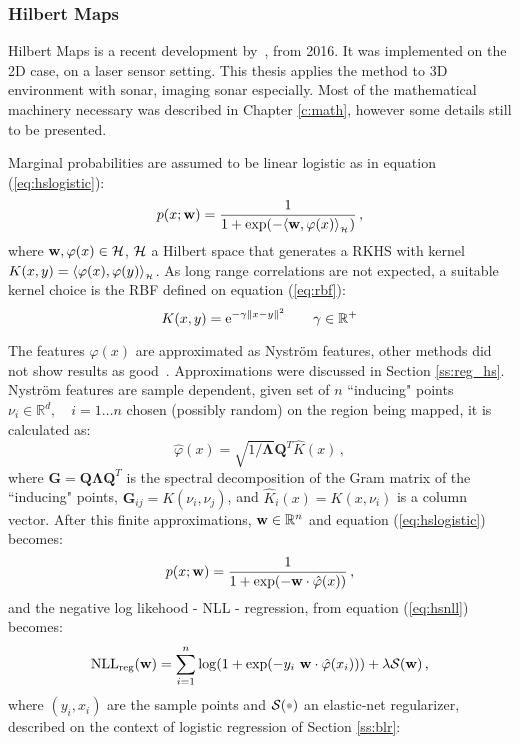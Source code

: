 \subsubsection{Hilbert Maps}
\label{sss:hilbertcontinuousmap}
Hilbert Maps is a recent development by~\citet{ramos2016hilbert}, from 2016. It
was implemented on the 2D case, on a laser sensor setting. This thesis applies
the method to 3D environment with sonar, imaging sonar especially. Most of the
mathematical machinery necessary was described in Chapter \ref{c:math}, however
some details still to be presented.

Marginal probabilities are assumed to be linear logistic as in equation
(\ref{eq:hslogistic}):
\begin{equation*}
p(x;\mathrm{\mathbf{w}}) = \frac{1}{1+\exp(-\langle \mathrm{\mathbf{w}},\varphi(x)\rangle_{_{\mathcal{H}}})}\,,
\end{equation*}
%
where $\mathrm{\mathbf{w}}, \varphi(x)\in\mathcal{H}$, $\mathcal{H}$ a Hilbert space that generates a RKHS
with kernel $K(x,y)=\langle \varphi(x),\varphi(y)\rangle_{_{\mathcal{H}}}$. As long range correlations
are not expected, a suitable kernel choice is the RBF defined on
equation (\ref{eq:rbf}):
\begin{equation*}
K(x,y) = \mathrm{e}^{-\gamma\left\lVert x-y\right\rVert^2} \qquad \gamma \in \mathbb{R}^+
\end{equation*}

The features $\varphi(x)$ are approximated as Nystr\"om features, other
methods did not show results as good~\cite{ramos2016hilbert}. Approximations
were discussed in Section \ref{ss:reg_hs}. Nystr\"om features are sample
dependent, given set of $n$ ``inducing" points $\nu_i\in\mathbb{R}^d, \quad
i=1\ldots n$ chosen (possibly random) on the region being mapped, it is
calculated as:
\begin{equation}
\label{eq:nystrom}
\hat\varphi(x) = \sqrt{1/\mathbf{\Lambda}}\mathbf{Q}^T\hat K(x)\,,
\end{equation}
 where $\mathbf{G}=\mathbf{Q}\mathbf{\Lambda}\mathbf{Q}^T$ is the
 spectral decomposition of the Gram matrix of the ``inducing" points,
 $\mathbf{G}_{ij}=K(\nu_i,\nu_j)$, and ${\displaystyle\hat K}_i(x) = K(x,\nu_i)$
 is a column vector. After this finite approximations,
 $\mathrm{\mathbf{w}}\in\mathbb{R}^n$ and equation (\ref{eq:hslogistic}) becomes:
\begin{equation}
\label{eq:hsmarg}
p(x;\mathrm{\mathbf{w}}) = \frac{1}{1+\exp(-\mathrm{\mathbf{w}}\cdot \hat\varphi(x))}\,,
\end{equation}
 and the negative log likehood - NLL - regression, from equation
 (\ref{eq:hsnll}) becomes:
\begin{equation}
\label{eq:finitenll}
\text{NLL}_{\text{reg}}(\mathrm{\mathbf{w}}) =  \sum_{i=1}^n \log(1+\exp(-y_i~
\mathrm{\mathbf{w}}\cdot\hat\varphi(x_i))) +\lambda\mathcal{S}(\mathrm{\mathbf{w}})\,,
\end{equation}
 where $(y_i,x_i)$ are the sample points and $\mathcal{S}(\parm)$ an
 elastic-net regularizer, described on the context of logistic regression of
 Section \ref{ss:blr}:
  
